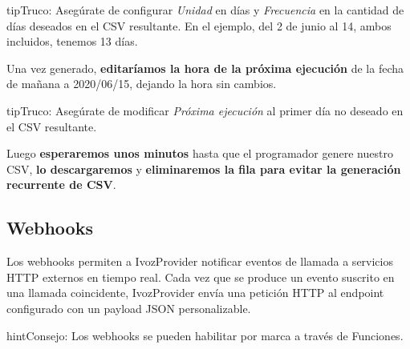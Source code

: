 \documentclass[letterpaper,10pt,spanish]{sphinxmanual}
\begin{document}
\begin{notice}{tip}{Truco:}
Asegúrate de configurar \emph{Unidad} en días y \emph{Frecuencia} en la cantidad de días deseados en el CSV resultante. En el ejemplo, del 2 de junio al 14, ambos incluidos, tenemos 13 días.
\end{notice}

Una vez generado, \textbf{editaríamos la hora de la próxima ejecución} de la fecha de mañana a 2020/06/15, dejando la hora sin cambios.

\begin{notice}{tip}{Truco:}
Asegúrate de modificar \emph{Próxima ejecución} al primer día no deseado en el CSV resultante.
\end{notice}

Luego \textbf{esperaremos unos minutos} hasta que el programador genere nuestro CSV, \textbf{lo descargaremos} y \textbf{eliminaremos la fila para evitar la generación recurrente de CSV}.


\subsection{Webhooks}
\label{administration_portal/brand/calls/webhooks:brand-webhooks}\label{administration_portal/brand/calls/webhooks:webhooks}\label{administration_portal/brand/calls/webhooks::doc}
Los webhooks permiten a IvozProvider notificar eventos de llamada a servicios HTTP externos en tiempo real. Cada vez que se produce un evento suscrito en una llamada coincidente, IvozProvider envía una petición HTTP  al endpoint configurado con un payload JSON personalizable.

\begin{notice}{hint}{Consejo:}
Los webhooks se pueden habilitar por marca a través de Funciones.
\end{notice}
\end{document}
